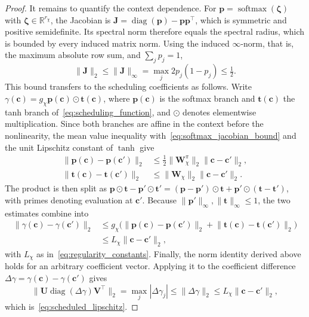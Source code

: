 \documentclass[journal]{IEEEtran}
\newcommand{\vp}{\mathbf{p}}
\newcommand{\vc}{\mathbf{c}}
\newcommand{\mU}{\mathbf{U}}
\newcommand{\mV}{\mathbf{V}}
\newcommand{\mW}{\mathbf{W}}
\newcommand{\R}{\mathbb{R}}
\newcommand{\norm}[2][]{\mathopen{#1\lVert}#2\mathclose{#1\rVert}}
\theoremstyle{plain}
\theoremstyle{definition}
\theoremstyle{definition}
\begin{document}
\begin{proof}
It remains to quantify the context dependence. For
$\vp=\operatorname{softmax}(\boldsymbol\zeta)$ with
$\boldsymbol\zeta\in\R^{r_\chi}$, the Jacobian is
$\mathbf J=\operatorname{diag}(\vp)-\vp\vp^\top$, which is symmetric
and positive semidefinite. Its spectral norm therefore equals the
spectral radius, which is bounded by every induced matrix norm. Using
the induced $\infty$-norm, that is, the maximum absolute row sum, and
$\sum_jp_j=1$,
\begin{equation}
\norm{\mathbf J}_2\le\norm{\mathbf J}_\infty
=\max_j2p_j(1-p_j)\le\tfrac12.
\label{eq:softmax_jacobian_bound}
\end{equation}
This bound transfers to the scheduling coefficients as follows. Write
$\gamma(\vc)=g_\chi\vp(\vc)\odot\mathbf t(\vc)$, where $\vp(\vc)$ is
the softmax branch and $\mathbf t(\vc)$ the tanh branch
of~\eqref{eq:scheduling_function}, and $\odot$ denotes elementwise
multiplication. Since both branches are affine in the context before
the nonlinearity, the mean value inequality
with~\eqref{eq:softmax_jacobian_bound} and the unit Lipschitz constant
of $\tanh$ give
\begin{equation*}
\begin{aligned}
\norm{\vp(\vc)-\vp(\vc')}_2
&\le\tfrac12\norm{\mW_\chi^\pi}_2\norm{\vc-\vc'}_2,\\
\norm{\mathbf t(\vc)-\mathbf t(\vc')}_2
&\le\norm{\mW_\chi}_2\norm{\vc-\vc'}_2.
\end{aligned}
\end{equation*}
The product is then split as
$\vp\odot\mathbf t-\vp'\odot\mathbf t'
=(\vp-\vp')\odot\mathbf t+\vp'\odot(\mathbf t-\mathbf t')$, with
primes denoting evaluation at $\vc'$. Because
$\norm{\vp'}_\infty,\norm{\mathbf t}_\infty\le1$, the two estimates
combine into
\begin{equation*}
\begin{aligned}
\norm{\gamma(\vc)-\gamma(\vc')}_2
&\le g_\chi\big(\norm{\vp(\vc)-\vp(\vc')}_2
+\norm{\mathbf t(\vc)-\mathbf t(\vc')}_2\big)\\
&\le L_\chi\norm{\vc-\vc'}_2,
\end{aligned}
\end{equation*}
with $L_\chi$ as in~\eqref{eq:regularity_constants}. Finally, the norm
identity derived above holds for an arbitrary coefficient vector.
Applying it to the coefficient difference
$\Delta\gamma=\gamma(\vc)-\gamma(\vc')$ gives
\begin{equation*}
\norm{\mU\operatorname{diag}(\Delta\gamma)\mV^\top}_2
=\max_j|\Delta\gamma_j|
\le\norm{\Delta\gamma}_2
\le L_\chi\norm{\vc-\vc'}_2,
\end{equation*}
which is~\eqref{eq:scheduled_lipschitz}.
\end{proof}
\end{document}
